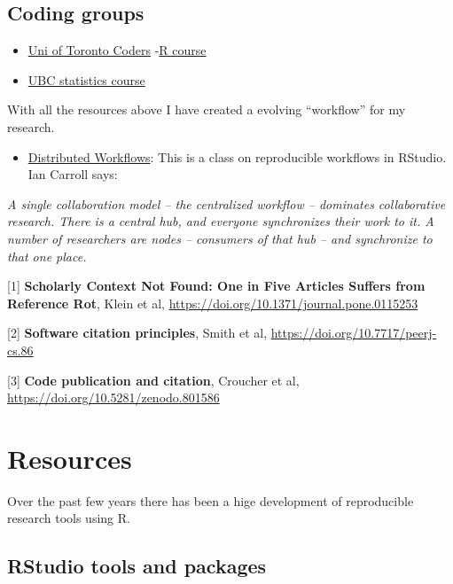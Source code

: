 \documentclass[
]{book}
\providecommand{\tightlist}{%
  \setlength{\itemsep}{0pt}\setlength{\parskip}{0pt}}
\theoremstyle{definition}
\theoremstyle{definition}
\theoremstyle{definition}
\theoremstyle{definition}
\theoremstyle{remark}
\begin{document}
\hypertarget{coding-groups}{%
\section{Coding groups}\label{coding-groups}}

\begin{itemize}
\item
  \href{https://github.com/UofTCoders}{Uni of Toronto Coders}
  -\href{https://github.com/UofTCoders/rcourse}{R course}
\item
  \href{http://stat545.com/Classroom/}{UBC statistics course}
\end{itemize}

With all the resources above I have created a evolving ``workflow'' for my research.

\begin{itemize}
\tightlist
\item
  \href{https://cyberhelp.sesync.org/basic-git-lesson/2016/08/25/}{Distributed Workflows}: This is a class on reproducible workflows in RStudio. Ian Carroll says:
\end{itemize}

\emph{A single collaboration model -- the centralized workflow -- dominates collaborative research. There is a central hub, and everyone synchronizes their work to it. A number of researchers are nodes -- consumers of that hub -- and synchronize to that one place.}

{[}1{]} \textbf{Scholarly Context Not Found: One in Five Articles Suffers from Reference Rot}, Klein et al, \url{https://doi.org/10.1371/journal.pone.0115253}

{[}2{]} \textbf{Software citation principles}, Smith et al, \url{https://doi.org/10.7717/peerj-cs.86}

{[}3{]} \textbf{Code publication and citation}, Croucher et al, \url{https://doi.org/10.5281/zenodo.801586}

\hypertarget{resources-1}{%
\chapter{Resources}\label{resources-1}}

Over the past few years there has been a hige development of reproducible research tools using R.

\hypertarget{rstudio-tools-and-packages}{%
\section{RStudio tools and packages}\label{rstudio-tools-and-packages}}
\end{document}
